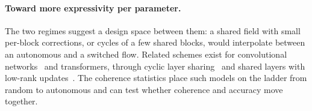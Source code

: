\paragraph{Toward more expressivity per parameter.}
The two regimes suggest a design space between them: a shared field with small
per-block corrections, or cycles of a few shared blocks, would interpolate between an
autonomous and a switched flow.
Related schemes exist for convolutional networks~\citep{savarese2019learning} and
transformers, through cyclic layer sharing~\citep{takase2021lessons} and shared layers
with low-rank updates~\citep{bae2024relaxed}.
The coherence statistics place such models on the ladder from random to autonomous
and can test whether coherence and accuracy move together.

